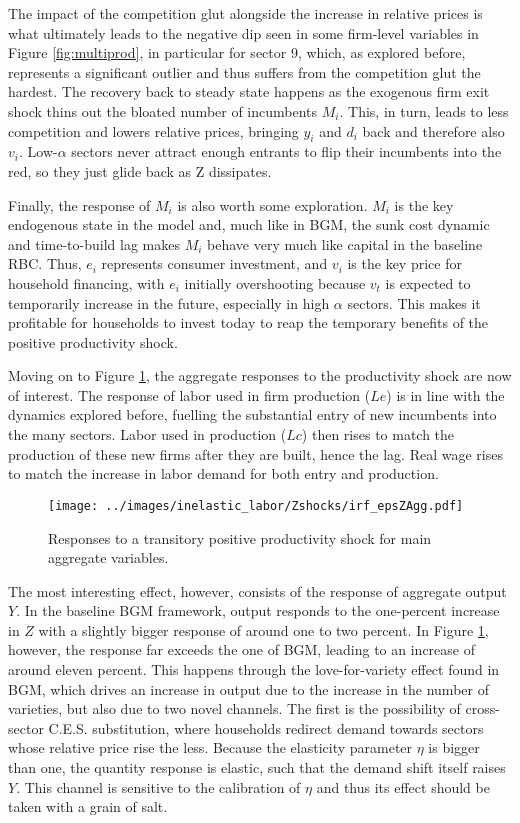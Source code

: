 \documentclass[a4paper,12pt]{article} %
\numberwithin{equation}{section} %
\numberwithin{figure}{section}
\numberwithin{table}{section}
\begin{document}
The impact of the competition glut alongside the increase in relative prices is what ultimately leads to the negative dip seen in some firm-level variables in
Figure \ref{fig:multiprod}, in particular for sector 9, which, as explored before, represents a significant outlier 
and thus suffers from the competition glut the hardest. The recovery back to steady state happens as the exogenous firm exit shock
thins out the bloated number of incumbents $M_i$. This, in turn, leads to less competition and lowers relative prices, bringing $y_i$ and $d_i$
back and therefore also $v_i$. Low-$\alpha$ sectors never attract enough entrants to flip their incumbents into the red, so they just glide
back as Z dissipates.

Finally, the response of $M_i$ is also worth some exploration. $M_i$ is the key endogenous state in the model and,
much like in BGM, the sunk cost dynamic and time-to-build lag makes $M_i$ behave very much like capital in the 
baseline RBC. Thus, $e_i$ represents consumer investment, and $v_i$ is the key price for household financing, with $e_i$ initially overshooting
because $v_t$ is expected to temporarily increase in the future, especially in high $\alpha$ sectors. This makes it profitable for households
to invest today to reap the temporary benefits of the positive productivity shock.

Moving on to Figure \ref{fig:aggprod}, the aggregate responses to the productivity shock are now of interest. The response of labor used in
firm production ($Le$) is in line with the dynamics explored before, fuelling the substantial entry of new incumbents into the many sectors.
Labor used in production ($Lc$) then rises to match the production of these new firms after they are built, hence the lag. Real wage rises to
match the increase in labor demand for both entry and production.

\begin{figure}[H]
  \centering
  \texttt{[image: ../images/inelastic\_labor/Zshocks/irf\_epsZAgg.pdf]}
  \caption{Responses to a transitory positive productivity shock for main aggregate variables.}
  \label{fig:aggprod}
\end{figure}

The most interesting effect, however, consists of the response of aggregate
output $Y$. In the baseline BGM framework, output responds to the one-percent increase in $Z$ with a slightly bigger response of 
around one to two percent. In Figure \ref{fig:aggprod}, however, the response far exceeds the one of BGM, leading to an increase of
around eleven percent. This happens through the love-for-variety effect found in BGM, which drives an increase
in output due to the increase in the number of varieties, but also due to two novel channels. The first is the possibility of cross-sector
C.E.S. substitution, where households redirect demand towards sectors whose relative price rise the less. Because the elasticity parameter
$\eta$ is bigger than one, the quantity response is elastic, such that the demand shift itself raises $Y$. This channel is sensitive to
the calibration of $\eta$ and thus its effect should be taken with a grain of salt.
\end{document}
